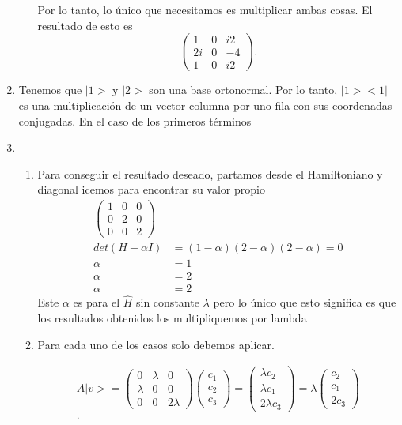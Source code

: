 \documentclass[12pt]{exam}
\begin{document}
\begin{enumerate}
\begin{enumerate}
    Por lo tanto, lo único que necesitamos es multiplicar ambas cosas. El resultado de esto es \[
    \begin{pmatrix} 
      1 & 0 & i2\\
      2i & 0 & -4\\
      1 & 0 & i2
    \end{pmatrix} 
    .\] 
\end{enumerate}
\item Tenemos que $|1>$ y  $|2>$ son una base ortonormal. Por lo tanto, $|1><1|$ es una multiplicación de un vector columna por uno fila con sus coordenadas conjugadas. En el caso de los primeros términos 
  \item 
    \begin{enumerate}
      \item Para conseguir el resultado deseado, partamos desde el Hamiltoniano y diagonal icemos para encontrar su valor propio
	\begin{align*}
	  \begin{pmatrix} 
	    1 & 0 & 0\\
	    0 & 2 & 0\\
	    0 & 0 & 2
	  \end{pmatrix} \\
	  det(H-\alpha I) &= (1-\alpha)(2-\alpha)(2-\alpha) = 0\\
	  \alpha &= 1\\
	  \alpha &= 2\\
	  \alpha &= 2
      \end{align*}
Este $\alpha$ es para el $\hat{H}$ sin constante $\lambda$ pero lo único que esto significa es que los resultados obtenidos los multipliquemos por lambda

     \item Para cada uno de los casos solo debemos aplicar.

      \begin{align*}
        A|v> = \begin{pmatrix} 
	  0 & \lambda & 0\\
	  \lambda & 0 & 0\\
	  0 & 0 & 2\lambda
	\end{pmatrix}\begin{pmatrix} 
	c_1 \\ c_2\\ c_3
	\end{pmatrix}=\begin{pmatrix} \lambda c_2 \\ \lambda c_1\\ 2\lambda c_3 \end{pmatrix}=\lambda\begin{pmatrix} c_2 \\ c_1 \\ 2c_3  \end{pmatrix}\\
      .\end{align*}


\end{enumerate}
\end{enumerate}
\end{document}
